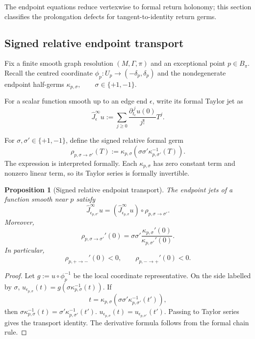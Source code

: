 \documentclass[11pt]{article}
\theoremstyle{plain}
\newtheorem{proposition}[theorem]{Proposition}
\theoremstyle{definition}
\begin{document}
The endpoint equations reduce vertexwise to formal return holonomy; this section classifies the prolongation defects for tangent-to-identity return germs.

\subsection{Signed relative endpoint transport}
\label{subsec:signed-endpoint-transport}

Fix a finite smooth graph resolution \((M,\Gamma,\pi)\) and an exceptional point
\(p\in B_\pi\).
Recall the centred coordinate \(\phi_p: U_p\longrightarrow(-\delta_p,\delta_p)\) and the nondegenerate endpoint half-germs
\(\kappa_{p,\sigma}, \qquad \sigma\in\{+1,-1\}\).

For a scalar function smooth up to an edge end \(\epsilon\), write its
formal Taylor jet as
\[
  \widehat J_\epsilon^\infty u
  :=
  \sum_{j\geq0}
  \frac{
    \partial_{t_\epsilon}^{\,j}u(0)
  }{
    j!
  }
  T^j.
\]

For
\(\sigma,\sigma'\in\{+1,-1\}\),
define the signed relative formal germ
\[
  \rho_{p,\sigma\to\sigma'}(T)
  :=
  \kappa_{p,\sigma}
  \left(
    \sigma\sigma'
    \kappa_{p,\sigma'}^{-1}(T)
  \right).
\]
The expression is interpreted formally. Each
\(\kappa_{p,\sigma}\) has zero constant term and nonzero linear term,
so its Taylor series is formally invertible.

\begin{proposition}[Signed relative endpoint transport]
\label{prop:correct-relative-endpoint-transport}
The endpoint jets of a function smooth near \(p\) satisfy
\[
  \boxed{
  \widehat J_{\epsilon_{p,\sigma'}}^\infty u
  =
  \left(
    \widehat J_{\epsilon_{p,\sigma}}^\infty u
  \right)
  \circ
  \rho_{p,\sigma\to\sigma'}.
  }
\]
Moreover,
\[
  \rho_{p,\sigma\to\sigma'}'(0)
  =
  \sigma\sigma'
  \frac{
    \kappa_{p,\sigma}'(0)
  }{
    \kappa_{p,\sigma'}'(0)
  }.
\]
In particular,
\[
  \rho_{p,+\to-}'(0)<0,
  \qquad
  \rho_{p,-\to+}'(0)<0.
\]
\end{proposition}

\begin{proof}
Let \(g:=u\circ\phi_p^{-1}\) be the local coordinate representative. On the side labelled by
\(\sigma\),
\(u_{\epsilon_{p,\sigma}}(t) = g \left( \sigma\kappa_{p,\sigma}^{-1}(t) \right)\).
If
\[
  t
  =
  \kappa_{p,\sigma}
  \left(
    \sigma\sigma'
    \kappa_{p,\sigma'}^{-1}(t')
  \right),
\]
then
\(\sigma\kappa_{p,\sigma}^{-1}(t) = \sigma' \kappa_{p,\sigma'}^{-1}(t')\).
\(u_{\epsilon_{p,\sigma}}(t) = u_{\epsilon_{p,\sigma'}}(t')\).
Passing to Taylor series gives the transport identity. The derivative
formula follows from the formal chain rule.
\end{proof}
\end{document}
